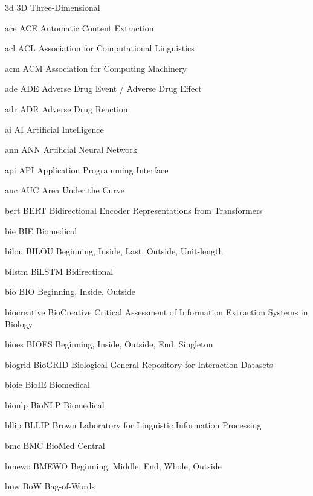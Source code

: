 \newabbreviation
{3d}
{3D}
{Three-Dimensional}

\newabbreviation
{ace}
{ACE}
{Automatic Content Extraction}

\newabbreviation
{acl}
{ACL}
{Association for Computational Linguistics}

\newabbreviation
{acm}
{ACM}
{Association for Computing Machinery}

\newabbreviation
{ade}
{ADE}
{Adverse Drug Event / Adverse Drug Effect}

\newabbreviation
{adr}
{ADR}
{Adverse Drug Reaction}

\newabbreviation
{ai}
{AI}
{Artificial Intelligence}

\newabbreviation
{ann}
{ANN}
{Artificial Neural Network}

\newabbreviation
{api}
{API}
{Application Programming Interface}

\newabbreviation
{auc}
{AUC}
{Area Under the Curve}

\newabbreviation
{bert}
{BERT}
{Bidirectional Encoder Representations from Transformers}

\newabbreviation
{bie}
{BIE}
{Biomedical }

\newabbreviation
{bilou}
{BILOU}
{Beginning, Inside, Last, Outside, Unit-length}

\newabbreviation
{bilstm}
{BiLSTM}
{Bidirectional }

\newabbreviation
{bio}
{BIO}
{Beginning, Inside, Outside}

\newabbreviation
{biocreative}
{BioCreative}
{Critical Assessment of Information Extraction Systems in Biology}

\newabbreviation
{bioes}
{BIOES}
{Beginning, Inside, Outside, End, Singleton}

\newabbreviation
{biogrid}
{BioGRID}
{Biological General Repository for Interaction Datasets}

\newabbreviation
{bioie}
{BioIE}
{Biomedical }

\newabbreviation
{bionlp}
{BioNLP}
{Biomedical }

\newabbreviation
{bllip}
{BLLIP}
{Brown Laboratory for Linguistic Information Processing}

\newabbreviation
{bmc}
{BMC}
{BioMed Central}

\newabbreviation
{bmewo}
{BMEWO}
{Beginning, Middle, End, Whole, Outside}

\newabbreviation
{bow}
{BoW}
{Bag-of-Words}

